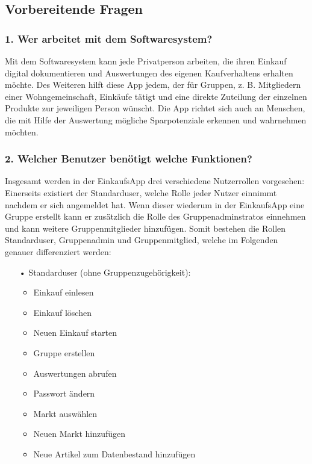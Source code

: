 \documentclass[12pt,a4paper]{article}
\begin{document}
\newpage
\subsection{Vorbereitende Fragen}
\subsubsection*{1. Wer arbeitet mit dem Softwaresystem?}
Mit dem Softwaresystem kann jede Privatperson arbeiten, die ihren Einkauf digital dokumentieren und Auswertungen des eigenen Kaufverhaltens erhalten möchte. 
Des Weiteren hilft diese App jedem, der für Gruppen, z. B. Mitgliedern einer Wohngemeinschaft, Einkäufe tätigt und eine direkte Zuteilung der einzelnen Produkte zur jeweiligen Person wünscht. 
Die App richtet sich auch an Menschen, die mit Hilfe der Auswertung mögliche Sparpotenziale erkennen und wahrnehmen möchten. 
\subsubsection*{2. Welcher Benutzer benötigt welche Funktionen?}
Insgesamt werden in der EinkaufsApp drei verschiedene Nutzerrollen vorgesehen:
Einerseits existiert der Standarduser, welche Rolle jeder Nutzer einnimmt nachdem er sich angemeldet hat.
Wenn dieser wiederum in der EinkaufsApp eine Gruppe erstellt kann er zusätzlich die Rolle des Gruppenadminstratos einnehmen und kann weitere Gruppenmitglieder hinzufügen.
Somit bestehen die Rollen Standarduser, Gruppenadmin und Gruppenmitglied, welche im Folgenden genauer differenziert werden:
\begin{itemize}
\item[•]Standarduser (ohne Gruppenzugehörigkeit):
\begin{itemize}
\item Einkauf einlesen
\item Einkauf löschen
\item Neuen Einkauf starten
\item Gruppe erstellen
\item Auswertungen abrufen
\item Passwort ändern
\item Markt auswählen
\item Neuen Markt hinzufügen
\item Neue Artikel zum Datenbestand hinzufügen
\end{itemize}       
\end{itemize} 
\end{document}
